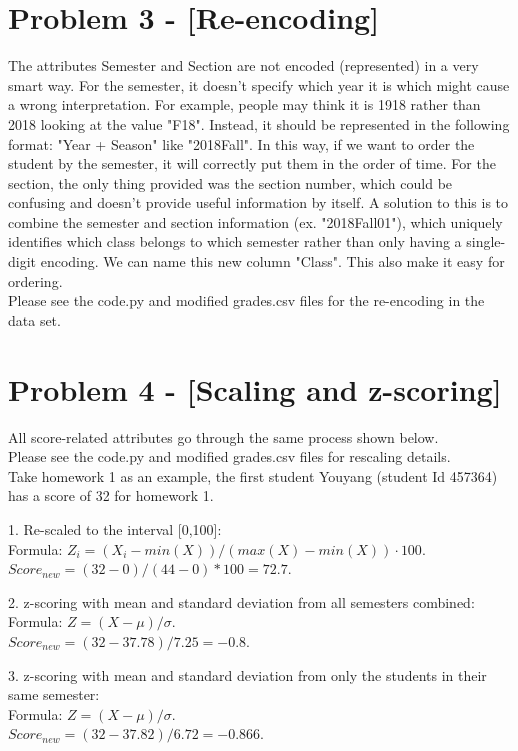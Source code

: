 \documentclass[9pt,twoside]{exam}
\begin{document}
\section*{Problem 3 -  [Re-encoding]}

The attributes Semester and Section are not encoded (represented) in a very smart way. For the semester, it doesn't specify which year it is which might cause a wrong interpretation. For example, people may think it is 1918 rather than 2018 looking at the value "F18". Instead, it should be represented in the following format: "Year + Season" like "2018Fall". In this way, if we want to order the student by the semester, it will correctly put them in the order of time. For the section, the only thing provided was the section number, which could be confusing and doesn't provide useful information by itself. A solution to this is to combine the semester and section information (ex. "2018Fall01"), which uniquely identifies which class belongs to which semester rather than only having a single-digit encoding. We can name this new column "Class". This also make it easy for ordering.\\
Please see the code.py and modified grades.csv files for the re-encoding in the data set.

\section*{Problem 4 -  [Scaling and z-scoring]}
All score-related attributes go through the same process shown below.\\
Please see the code.py and modified grades.csv files for rescaling details.\\
Take homework 1 as an example, the first student Youyang (student Id 457364) has a score of 32 for homework 1. 

1. Re-scaled to the interval [0,100]: \\
    Formula: $Z_{i} = (X_{i} - min(X)) / (max(X) - min(X)) \cdot 100$. \\
    $Score_{new} = (32 - 0)/(44-0) * 100 = 72.7$. 

2. z-scoring with mean and standard deviation from all semesters combined: \\
    Formula: $Z = (X - \mu) / \sigma$. \\
    $Score_{new} = (32 - 37.78)/7.25 = -0.8$. 

3. z-scoring with mean and standard deviation from only the students in their same semester:\\
    Formula: $Z = (X - \mu) / \sigma$. \\
    $Score_{new} = (32 - 37.82)/6.72 = -0.866$. 
\\
\end{document}
